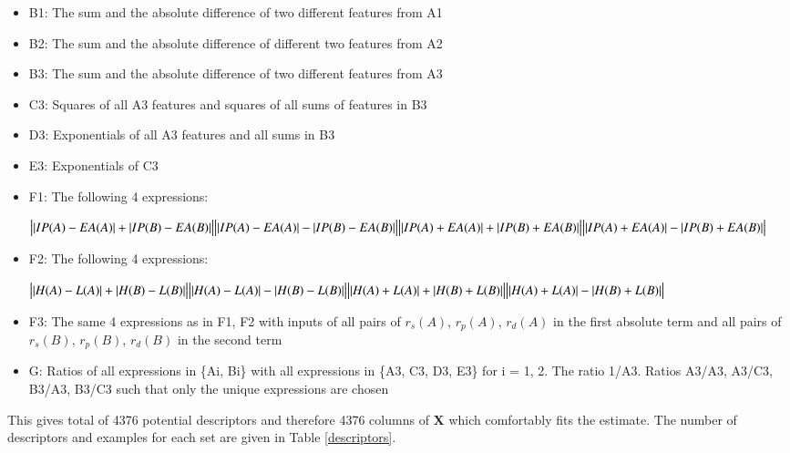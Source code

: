 \documentclass[11pt,oneside,czech,american]{book} %
\theoremstyle{plain}
\theoremstyle{definition}
\renewcommand{\vec}[1]{\boldsymbol{#1}}
\begin{document}
\begin{itemize}
	\item B1: The sum and the absolute difference of two different features from A1
	\item B2: The sum and the absolute difference of different two features from A2
	\item B3: The sum and the absolute difference of two different features from A3
	\item C3: Squares of all A3 features and squares of all sums of features in B3
	\item D3: Exponentials of all A3 features and all sums in B3
	\item E3: Exponentials of C3
	\item F1: The following 4 expressions:
	
	\begin{center}
		$\big||IP(A)-EA(A)|+|IP(B)-EA(B)|\big| \newline
		\big||IP(A)-EA(A)|-|IP(B)-EA(B)|\big| \newline
		\big||IP(A)+EA(A)|+|IP(B)+EA(B)|\big| \newline
		\big||IP(A)+EA(A)|-|IP(B)+EA(B)|\big| \newline$
	\end{center}
	\item F2: The following 4 expressions:
	
	\begin{center}
		$\big||H(A)-L(A)|+|H(B)-L(B)|\big| \newline
		\big||H(A)-L(A)|-|H(B)-L(B)|\big| \newline
		\big||H(A)+L(A)|+|H(B)+L(B)|\big| \newline
		\big||H(A)+L(A)|-|H(B)+L(B)|\big| \newline$
	\end{center}
	\item F3: The same 4 expressions as in F1, F2 with inputs of all pairs of $r_{s}(A)$, $r_{p}(A)$, $r_{d}(A)$ in the first absolute term and all pairs of $r_{s}(B)$, $r_{p}(B)$, $r_{d}(B)$ in the second term
	
	\item G: Ratios of all expressions in \{Ai, Bi\} with all expressions in \{A3, C3, D3, E3\} for i = 1, 2. The ratio 1/A3. Ratios A3/A3, A3/C3, B3/A3, B3/C3 such that only the unique expressions are chosen
\end{itemize}

This gives total of 4376 potential descriptors and therefore 4376 columns of $\vec{X}$ which comfortably fits the estimate. The number of descriptors and examples for each set are given in Table \ref{descriptors}.
\end{document}
